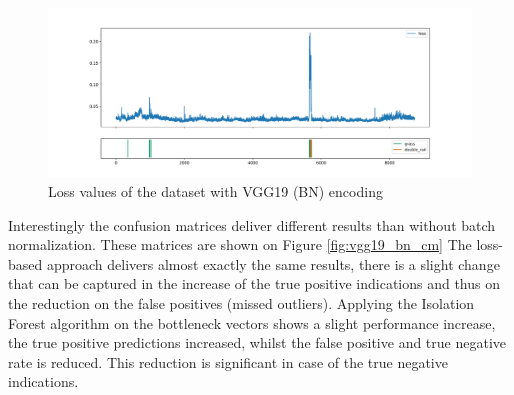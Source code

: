 \begin{figure}[!ht]
    \centering
    \includegraphics[width=\textwidth,trim={0 1cm 0 1cm},clip]{./results/vgg19_bn_vgg19/20230525_045131_feature_vectors_loss.png}
    \caption{Loss values of the dataset with VGG19 (BN) encoding}
    \label{fig:vgg19_bn_loss}
\end{figure}

Interestingly the confusion matrices deliver different results than without batch normalization.
These matrices are shown on Figure \ref{fig:vgg19_bn_cm}
The loss-based approach delivers almost exactly the same results, there is a slight change that can be
captured in the increase of the true positive indications and thus on the reduction
on the false positives (missed outliers).
Applying the Isolation Forest algorithm on the bottleneck vectors shows a slight performance increase,
the true positive predictions increased, whilst the false positive and true negative rate is reduced.
This reduction is significant in case of the true negative indications.

